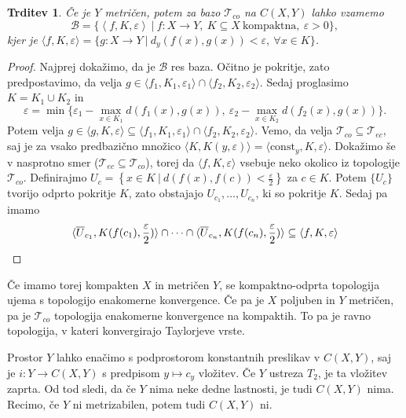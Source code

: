 \documentclass[10pt, a4paper]{article}
\newtheorem{trditev}[izr]{Trditev}
\newenvironment{noticeC}{%
  \tcolorbox[%
  notitle,
  empty,
  enhanced,  %
  breakable,
  coltext=black, 
  fontupper=\rmfamily,
  parbox=false,
  noparskip,
  sharp corners,
  boxrule=-1pt,  %
  frame hidden,
  left=7pt,  %
  right=7pt,
  top=5pt,
  bottom=5pt,
  before skip=2.5ex plus 2pt,
  after skip=2.5ex plus 2pt,
  overlay unbroken and last={%
  },
  ]}
{\endtcolorbox}
\newenvironment{dokaz}%
  {\begin{noticeC}\begin{proof}}%
  {\end{proof}\end{noticeC}}
\newcommand{\sprod}[2]{\langle {#1},{#2} \rangle}
\newcommand{\topo}[1]{\mathcal{#1}}
\begin{document}
\begin{trditev}
  Če je $Y$ metričen, potem za bazo $\topo{T}_{co}$ na $C(X, Y)$ lahko vzamemo 
  $$\mathcal{B} = \{\left\langle f, K, \varepsilon\right\rangle\ |\ f: X \to Y,\ K \subseteq X\ \mathrm{\text{kompaktna}},\ \varepsilon > 0 \},$$
  kjer je $\langle f, K, \varepsilon \rangle = \{g: X \to Y\ |\ d_y (f(x), g(x)) < \varepsilon,\ \forall x \in K\}$.
\end{trditev}

\begin{dokaz}
  Najprej dokažimo, da je $\mathcal{B}$ res baza. Očitno je pokritje, zato predpostavimo, da velja 
  $g \in \langle f_1, K_1, \varepsilon_1 \rangle \cap \langle f_2, K_2, \varepsilon_2 \rangle$.
  Sedaj proglasimo $K = K_1 \cup K_2$ in 
  $$\varepsilon = \min \{\varepsilon_1 - \max_{x \in K_1} d(f_1(x), g(x)),\ \varepsilon_2 - \max_{x \in K_2} d(f_2 (x), g(x))\}.$$
  Potem velja $g \in \langle g, K, \varepsilon \rangle \subseteq \langle f_1, K_1, \varepsilon_1 \rangle \cap \langle f_2, K_2, \varepsilon_2 \rangle$.
  Vemo, da velja $\mathcal{T}_{co} \subseteq \topo{T}_{ec}$, saj je za vsako predbazično množico $\sprod{K}{K(y, \varepsilon)} = \langle \mathrm{const}_y, K, \varepsilon \rangle$.
  Dokažimo še v nasprotno smer ($\topo{T}_{ec} \subseteq \mathcal{T}_{co}$), torej da $\langle f, K, \varepsilon \rangle$ vsebuje neko okolico iz topologije $\topo{T}_{co}$.
  Definirajmo $U_c = \left\lbrace x \in K\ |\ d(f(x), f(c)) < \frac{\varepsilon}{2}\right\rbrace$ za $c \in K$.
  Potem $\{U_c\}$ tvorijo odprto pokritje $K$, zato obstajajo $U_{c_1},\dots, U_{c_n}$, ki so pokritje $K$.
  Sedaj pa imamo 
  \begin{equation*}
    \sprod{\overline{U}_{c_1}}{K(f(c_1),\frac{\varepsilon}{2})} \cap \dots \cap \sprod{\overline{U}_{c_n}}{K(f(c_n),\frac{\varepsilon}{2})} \subseteq \langle f, K, \varepsilon \rangle \qedhere
  \end{equation*}
\end{dokaz}

Če imamo torej kompakten $X$ in metričen $Y$, se kompaktno-odprta topologija ujema s topologijo enakomerne konvergence.
Če pa je $X$ poljuben in $Y$ metričen, pa je $\topo{T}_{co}$ topologija enakomerne konvergence na kompaktih.
To pa je ravno topologija, v kateri konvergirajo Taylorjeve vrste.

Prostor $Y$ lahko enačimo s podprostorom konstantnih preslikav v $C(X, Y)$, saj je 
$i: Y \to C(X, Y)$ s predpisom $y \mapsto c_y$ vložitev.
Če $Y$ ustreza $T_2$, je ta vložitev zaprta. Od tod sledi, da če $Y$ nima neke dedne lastnosti, je tudi $C(X, Y)$ nima.
Recimo, če $Y$ ni metrizabilen, potem tudi $C(X, Y)$ ni.
\end{document}

